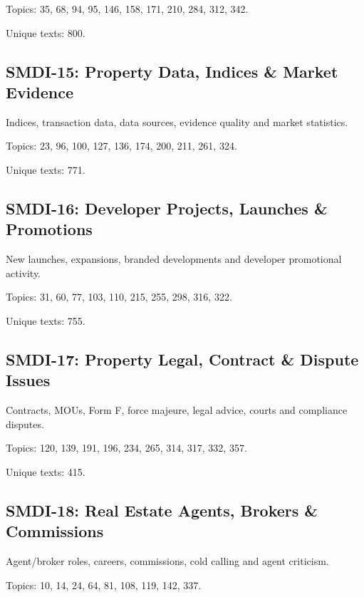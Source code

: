 \documentclass[10pt]{article}
\begin{document}
\par Topics: 35, 68, 94, 95, 146, 158, 171, 210, 284, 312, 342.

\par Unique texts: 800.

\subsection*{SMDI-15: Property Data, Indices \& Market Evidence}

Indices, transaction data, data sources, evidence quality and market statistics.

\par Topics: 23, 96, 100, 127, 136, 174, 200, 211, 261, 324.

\par Unique texts: 771.

\subsection*{SMDI-16: Developer Projects, Launches \& Promotions}

New launches, expansions, branded developments and developer promotional activity.

\par Topics: 31, 60, 77, 103, 110, 215, 255, 298, 316, 322.

\par Unique texts: 755.

\subsection*{SMDI-17: Property Legal, Contract \& Dispute Issues}

Contracts, MOUs, Form F, force majeure, legal advice, courts and compliance disputes.

\par Topics: 120, 139, 191, 196, 234, 265, 314, 317, 332, 357.

\par Unique texts: 415.

\subsection*{SMDI-18: Real Estate Agents, Brokers \& Commissions}

Agent/broker roles, careers, commissions, cold calling and agent criticism.

\par Topics: 10, 14, 24, 64, 81, 108, 119, 142, 337.
\end{document}
